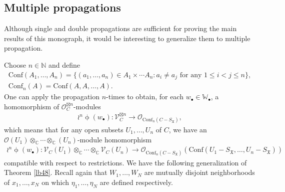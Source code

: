 \documentclass[12pt,b5paper,notitlepage]{report}
\theoremstyle{definition}
\theoremstyle{plain}
\newcommand{\fk}{\mathfrak}
\newcommand{\Conf}{\mathrm{Conf}}
\newcommand{\scr}{\mathscr}
\newcommand{\blt}{\bullet}
\newcommand{\Wbb}{\mathbb W}
\newcommand{\Cbb}{\mathbb C}
\newcommand{\Nbb}{\mathbb N}
\numberwithin{equation}{section}
\begin{document}
\subsection*{Multiple propagations}

Although single and double propagations are sufficient for proving the main results of this monograph, it would be interesting to generalize them to multiple propagation.

Choose $n\in\Nbb$ and define \index{Conf@$\Conf$}
\begin{gather*}
\Conf(A_1,\dots,A_n)=\{(a_1,\dots,a_n)\in A_1\times\cdots A_n:a_i\neq a_j\text{ for any }1\leq i<j\leq n\},\\
\Conf_n(A)=\Conf(A,A,\dots,A).
\end{gather*}
One can apply the propagation $n$-times  to obtain, for each $w_\blt\in\Wbb_\blt$, a homomorphism of $\scr O_C^{\boxtimes n}$-modules
\begin{align}
\wr^n\upphi(w_\blt):\scr V_C^{\boxtimes n}\rightarrow\scr O_{\Conf_n(C-S_{\fk X})},
\end{align}
which means that for any open subsets $U_1,\dots,U_n$ of $C$, we have  an $\scr O(U_1)\otimes_\Cbb\cdots\otimes_\Cbb(U_n)$-module  homomorphism
\begin{align*}
\wr^n\upphi(w_\blt):\scr V_C(U_1)\otimes_\Cbb\cdots\otimes_\Cbb\scr V_C(U_n)\rightarrow\scr O_{\Conf_n(C-S_{\fk X})}(\Conf(U_1-S_{\fk X},\dots,U_n-S_{\fk X}))
\end{align*}
compatible with respect to restrictions. We have the following generalization of Theorem \ref{lb48}. Recall again that $W_1,\dots,W_N$ are mutually disjoint neighborhoods of $x_1,\dots,x_N$ on which $\eta_1,\dots,\eta_N$ are defined respectively.
\end{document}
